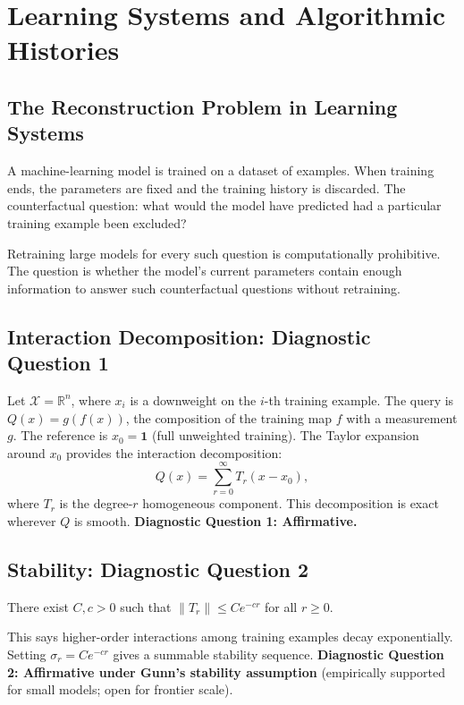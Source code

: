 \chapter{Learning Systems and Algorithmic Histories}

\section{The Reconstruction Problem in Learning Systems}

A machine-learning model is trained on a dataset of examples. When training ends, the parameters are fixed and the training history is discarded. The counterfactual question: what would the model have predicted had a particular training example been excluded?

Retraining large models for every such question is computationally prohibitive. The question is whether the model's current parameters contain enough information to answer such counterfactual questions without retraining.

\section{Interaction Decomposition: Diagnostic Question 1}

Let $\mathcal{X} = \mathbb{R}^n$, where $x_i$ is a downweight on the $i$-th training example. The query is $Q(x) = g(f(x))$, the composition of the training map $f$ with a measurement $g$. The reference is $x_0 = \mathbf{1}$ (full unweighted training). The Taylor expansion around $x_0$ provides the interaction decomposition:
\[
  Q(x) = \sum_{r=0}^\infty T_r(x - x_0),
\]
where $T_r$ is the degree-$r$ homogeneous component. This decomposition is exact wherever $Q$ is smooth. \textbf{Diagnostic Question 1: Affirmative.}

\section{Stability: Diagnostic Question 2}

\begin{definition}
There exist $C, c > 0$ such that $\|T_r\| \leq Ce^{-cr}$ for all $r \geq 0$.
\end{definition}

This says higher-order interactions among training examples decay exponentially. Setting $\sigma_r = Ce^{-cr}$ gives a summable stability sequence. \textbf{Diagnostic Question 2: Affirmative under Gunn's stability assumption} (empirically supported for small models; open for frontier scale).

